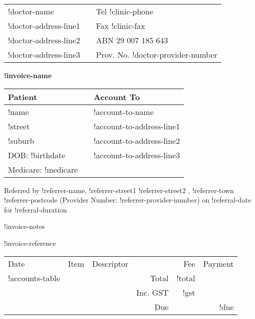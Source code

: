 \documentclass[12pt]{article}
\begin{document}
\begin{center}
\begin{tabular}{p{}>{\centering}p{}<{\centering}p{}<{\raggedleft}}
!doctor-name &  & Tel !clinic-phone \\
!doctor-address-line1 &  & Fax !clinic-fax \\
!doctor-address-line2 & & ABN 29 007 185 643 \\
!doctor-address-line3 & & Prov. No. !doctor-provider-number\\ 
\hline
\end{tabular}

\vspace{7mm}

{ \Large \textbf{!invoice-name} }

\end{center}

\vspace{4mm}


\begin{tabular}{lp{5mm}l} 
Patient & & Account To\\ \midrule
!name & & !account-to-name \\
!street & & !account-to-address-line1 \\
!suburb & & !account-to-address-line2 \\
DOB: !birthdate &  & !account-to-address-line3 \\
Medicare:   !medicare & &   \\
\end{tabular}

\vspace{3mm}

Referred by !referrer-name, !referrer-street1 !referrer-street2 ,
!referrer-town !referrer-postcode (Provider Number: !referrer-provider-number)
on !referral-date for !referral-duration

\vspace{3mm}

!invoice-notes

!invoice-reference

\vspace{3mm}

\begin{tabularx}{\textwidth}{llp{50mm}rrr}
Date & Item & Descriptor & & Fee & Payment \\ \cmidrule(l){1-6}
!accounts-table
\cmidrule(l){5-6}
& & & Total & !total  & \\
& & & Inc. GST & !gst & \\ \cmidrule(l){5-6}
& & & Due & & !due \\

\end{tabularx}
\end{document}
